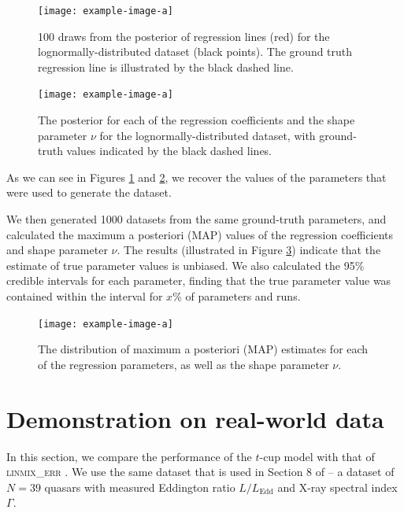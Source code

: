 \documentclass[fleqn,usenatbib]{mnras}
\begin{document}
\begin{figure}
    \texttt{[image: example-image-a]}
    \caption{{\color{red} 100} draws from the posterior of regression lines
    (red) for the lognormally-distributed dataset (black points). The ground
    truth regression line is illustrated by the black dashed line.}
    \label{fig:results.lognormal.regression}
\end{figure}

\begin{figure}
    \texttt{[image: example-image-a]}
    \caption{The posterior for each of the regression coefficients and the shape
    parameter $\nu$ for the lognormally-distributed dataset, with ground-truth
    values indicated by the black dashed lines.}
    \label{fig:results.lognormal.corner}
\end{figure}

As we can see in Figures \ref{fig:results.lognormal.regression} and
\ref{fig:results.lognormal.corner}, we recover the values of the parameters that were
used to generate the dataset.

We then generated 1000 datasets from the same ground-truth parameters, and
calculated the maximum a posteriori (MAP) values of the regression coefficients
and shape parameter $\nu$. The results (illustrated in Figure
\ref{fig:results.lognormal.map}) indicate that the estimate of true parameter values is
unbiased.{
\color{red} We also calculated the 95\% credible intervals for each parameter,
finding that the true parameter value was contained within the interval for
$x$\% of parameters and runs.
}

\begin{figure}
    \texttt{[image: example-image-a]}
    \caption{The distribution of maximum a posteriori (MAP) estimates for each
    of the regression parameters, as well as the shape parameter $\nu$.}
    \label{fig:results.lognormal.map}
\end{figure}


\section{Demonstration on real-world data}
\label{sec:real-world}

In this section, we compare the performance of the $t$-cup model with that of
\textsc{linmix\_err} \citep{Kelly:2007}. We use the same dataset that is used in
Section 8 of \citet{Kelly:2007} -- a dataset of $N = 39$ quasars with measured
Eddington ratio $L / L_{\text{Edd}}$ and X-ray spectral index $\Gamma$.
\end{document}
